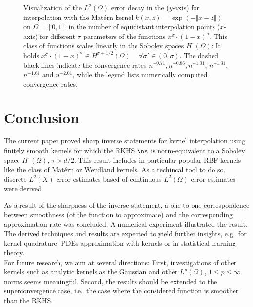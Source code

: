 \documentclass[a4paper, 10pt]{article}
\newlength\fwidth
\begin{document}
\begin{example}
%
%


\begin{figure}[hbt!]
\centering
\setlength{}
%
%
%
	
%
\caption{Visualization of the $L^2(\Omega)$ error decay in the ($y$-axis) for interpolation with the Matérn kernel $k(x, z) = \exp(-\Vert x - z \Vert)$ on $\Omega = [0,1]$ in the number of equidistant interpolation points ($x$-axis) for different $\sigma$ parameters of the functions $x^\sigma \cdot (1-x)^\sigma$.
This class of functions scales linearly in the Sobolev spaces $H^\tau(\Omega)$: 
It holds $x^\sigma \cdot (1-x)^\sigma \in H^{\sigma + 1/2}(\Omega)$ ~ $\forall \sigma' \in (0, \sigma)$.
The dashed black lines indicate the convergence rates $n^{-0.71}, n^{-0.86}, n^{-1.01}$, $n^{-1.31}$, $n^{-1.61}$ and $n^{-2.01}$,
while the legend lists numerically computed convergence rates.}
\label{fig:matern_L2_error}
\end{figure}

\end{example}

\section{Conclusion} \label{sec:conclusion}

The current paper proved sharp inverse statements for kernel interpolation using finitely smooth kernels for which the RKHS $\ns$ is norm-equivalent to a Sobolev space $H^\tau(\Omega)$, $\tau > d/2$.
This result includes in particular popular RBF kernels like the class of Matérn or Wendland kernels.
As a techincal tool to do so, discrete $L^2(X)$ error estimates based of continuous $L^2(\Omega)$ error estimates were derived.

%
%
As a result of the sharpness of the inverse statement, 
a one-to-one correspondence between smoothness (of the function to approximate) and the corresponding approximation rate was concluded. %
A numerical experiment illustrated the result.
The derived techniques and results are expected to yield further insights, e.g.\ for kernel quadrature, PDEs approximation with kernels or in statistical learning theory. \\
For future research, we aim at several directions:
First, investigations of other kernels such as analytic kernels as the Gaussian and other $L^p(\Omega)$, $1 \leq p \leq \infty$ norms seems meaningful.
Second, the results should be extended to the superconvergence case, i.e.\ the case where the considered function is smoother than the RKHS. \\
\end{document}

